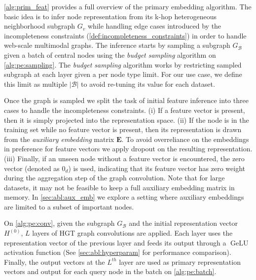 \cref{alg:prim_feat} provides a full overview of the primary embedding algorithm. 
The basic idea is to infer node representation from its k-hop heterogeneous neighborhood subgraph $G_v$ while handling edge cases introduced by the incompleteness constraints (\cref{def:incompleteness_constraints}) in order to handle web-scale multimodal graphs.
The inference starts by sampling a subgraph $G_{\mathcal{B}}$ given a batch of central nodes using the \textit{budget sampling} algorithm on \cref{alg:pe:sampling}.
The \textit{budget sampling} algorithm works by restricting sampled subgraph at each layer given a per node type limit.
For our use case, we define this limit as multiple $|\mathcal{B}|$ to avoid re-tuning its value for each dataset. 

Once the graph is sampled we split the task of initial feature inference into three cases to handle the incompleteness constraints.
(i) If a feature vector is present, then it is simply projected into the representation space.
(ii) If the node is in the training set while no feature vector is present, then its representation is drawn from the \textit{auxiliary embedding} matrix $\mathbf{E}$. To avoid overreliance on the embeddings in preference for feature vectors we apply dropout on the resulting representation.
(iii) Finally, if an unseen node without a feature vector is encountered, the zero vector (denoted as $0_d$) is used, indicating that its feature vector has zero weight during the aggregation step of the graph convolution.
Note that for large datasets, it may not be feasible to keep a full auxiliary embedding matrix in memory. 
In \cref{sec:abl:aux_emb} we explore a setting where auxiliary embeddings are limited to a subset of important nodes.



On \cref{alg:pe:conv}, given the subgraph $G_\mathcal{B}$ and the initial representation vector $H^{(0)}$,  $L$ layers of HGT graph convolutions are applied.
Each layer uses the representation vector of the previous layer and feeds its output through a $\operatorname{GeLU}$ \cite{hendrycksGaussianErrorLinear2020} activation function (See \cref{sec:abl:hyperparam} for performance comparison).
Finally, the output vectors at the $L^\mathit{th}$ layer are used as primary representation vectors and output for each query node in the batch on \cref{alg:pe:batch}. 

